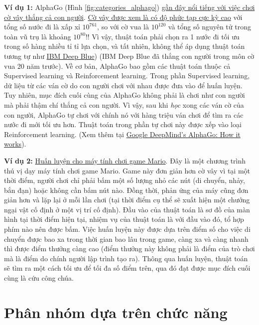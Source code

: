  
\textbf{Ví dụ 1:} AlphaGo (Hình \ref{fig:categories_alphago}) \href{https://gogameguru.com/tag/deepmind-alphago-lee-sedol/}{gần đây nổi tiếng với việc chơi cờ vây thắng cả con người}. \href{https://www.tastehit.com/blog/google-deepmind-alphago-how-it-works/}{Cờ vây được xem là có độ phức tạp cực kỳ cao} với tổng số nước đi là xấp xỉ $10^{761} $, so với cờ vua là $10^{120} $ và tổng số nguyên tử trong toàn vũ trụ là khoảng $10^{80}$!! Vì vậy, thuật toán phải chọn ra 1 nước đi tối ưu trong số hàng nhiều tỉ tỉ lựa chọn, và tất nhiên, không thể áp dụng thuật toán tương tự như \href{https://en.wikipedia.org/wiki/Deep_Blue_(chess_computer}{IBM Deep Blue}) (IBM Deep Blue đã thắng con người trong môn cờ vua 20 năm trước). Về cơ bản, AlphaGo bao gồm các thuật toán thuộc cả Supervised learning và Reinforcement learning. Trong phần Supervised learning, dữ liệu từ các ván cờ do con người chơi với nhau được đưa vào để huấn luyện. Tuy nhiên, mục đích cuối cùng của AlphaGo không phải là chơi như con người mà phải thậm chí thắng cả con người. Vì vậy, sau khi \textit{học} xong các ván cờ của con người, AlphaGo tự chơi với chính nó với hàng triệu ván chơi để tìm ra các nước đi mới tối ưu hơn. Thuật toán trong phần tự chơi này được xếp vào loại Reinforcement learning. (Xem thêm tại \href{https://www.tastehit.com/blog/google-deepmind-alphago-how-it-works/}{Google DeepMind's AlphaGo: How it works}). 
 
 
\textbf{Ví dụ 2:} \href{https://www.youtube.com/watch?v=qv6UVOQ0F44}{Huấn luyện cho máy tính chơi game Mario}. Đây là một chương trình thú vị dạy máy tính chơi game Mario. Game này đơn giản hơn cờ vây vì tại một thời điểm, người chơi chỉ phải bấm một số lượng nhỏ các nút (di chuyển, nhảy, bắn đạn) hoặc không cần bấm nút nào. Đồng thời, phản ứng của máy cũng đơn giản hơn và lặp lại ở mỗi lần chơi (tại thời điểm cụ thể sẽ xuất hiện một chướng ngại vật cố định ở một vị trí cố định). Đầu vào của thuật toán là sơ đồ của màn hình tại thời điểm hiện tại, nhiệm vụ của thuật toán là với đầu vào đó, tổ hợp phím nào nên được bấm. Việc huấn luyện này được dựa trên điểm số cho việc di chuyển được bao xa trong thời gian bao lâu trong game, càng xa và càng nhanh thì được điểm thưởng càng cao (điểm thưởng này không phải là điểm của trò chơi mà là điểm do chính người lập trình tạo ra). Thông qua huấn luyện, thuật toán sẽ tìm ra một cách tối ưu để tối đa số điểm trên, qua đó đạt được mục đích cuối cùng là cứu công chúa. 
 
 
 
\section{Phân nhóm dựa trên chức năng }
 

